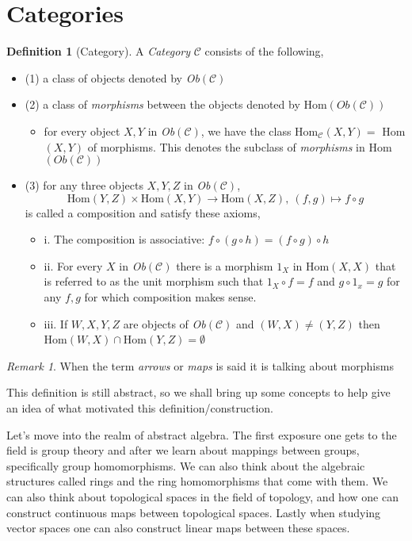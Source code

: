 \documentclass[12pt]{article}
\theoremstyle{definition}
\newtheorem{definition}{Definition}[section]
\theoremstyle{remark}
\newtheorem*{remark}{Remark}
\begin{document}
\section{Categories}
\begin{definition}[Category]
    A \textit{Category} $\mathcal{C}$ consists of the following,
\begin{itemize}
    \item{(1)} a class of objects denoted by \textit{Ob}$(\mathcal{C})$
    \item{(2)} a class of \textit{morphisms} between the objects denoted by Hom$(\textit{Ob}(\mathcal{C}))$
    \begin{itemize}
     \item{}for every object $X,Y$ in \textit{Ob}$(\mathcal{C})$, we have the class Hom$_\mathcal{C}(X,Y) = $ Hom$(X,Y)$ of morphisms. This denotes the subclass of \textit{morphisms} in Hom$(\textit{Ob}(\mathcal{C}))$
    \end{itemize}
    \item{(3)} for any three objects $X,Y,Z$ in \textit{Ob}$(\mathcal{C})$, \[\text{Hom}(Y,Z) \times \text{Hom}(X,Y) \to \text{Hom}(X,Z), \ (f,g) \mapsto f\circ g\] is called a composition and satisfy these axioms,
    \begin{itemize}
        \item{i.} The composition is associative: $f\circ (g\circ h) = (f\circ g) \circ h$ 
        \item{ii.} For every $X$ in \textit{Ob}$(\mathcal{C})$ there is a morphism $1_X$ in Hom$(X,X)$ that is referred to as the unit morphism such that $1_X \circ f = f$ and $g\circ 1_x = g$ for any $f,g$ for which composition makes sense.  
        \item{iii.} If $W,X,Y,Z$ are objects of \textit{Ob}$(\mathcal{C})$ and $(W,X) \neq (Y,Z)$ then Hom$(W,X) \cap \text{Hom}(Y,Z) = \emptyset$
    \end{itemize}
\end{itemize}
\end{definition}

\begin{remark}
    When the term \textit{arrows} or \textit{maps} is said it is talking about morphisms
\end{remark}

This definition is still abstract, so we shall bring up some concepts to help give an idea of what motivated this definition/construction.

Let's move into the realm of abstract algebra. The first exposure one gets to the field is group theory and after we learn about mappings between groups, specifically group homomorphisms. We can also think about the algebraic structures called rings and the ring homomorphisms that come with them. 
We can also think about topological spaces in the field of topology, and how one can construct continuous maps between topological spaces. Lastly when studying vector spaces one can also construct linear maps between these spaces. 
\end{document}
